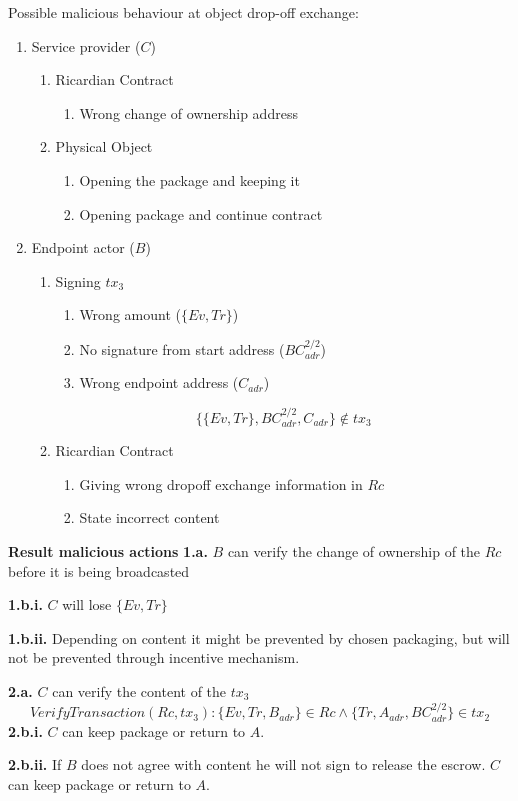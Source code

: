Possible malicious behaviour at object drop-off exchange:
\begin{enumerate}
  \item Service provider ($C$)
  \begin{enumerate}
    \item Ricardian Contract
    \begin{enumerate}
      \item Wrong change of ownership address
    \end{enumerate}
    \item Physical Object
    \begin{enumerate}
      \item Opening the package and keeping it
      \item Opening package and continue contract
    \end{enumerate}
  \end{enumerate}
  \item Endpoint actor ($B$)
  \begin{enumerate}
    \item Signing $tx_3$
    \begin{enumerate}
      \item Wrong amount ($\{Ev, Tr\}$)
      \item No signature from start address ($BC_{adr}^{2/2}$)
      \item Wrong endpoint address ($C_{adr}$)
    \end{enumerate}
    \[\{\{Ev, Tr\}, BC_{adr}^{2/2}, C_{adr}\}\not\in tx_3\]
    \item Ricardian Contract
    \begin{enumerate}
      \item Giving wrong dropoff exchange information in $Rc$
      \item State incorrect content
    \end{enumerate}
  \end{enumerate}
\end{enumerate}

\bigbreak
\noindent\textbf{Result malicious actions}
\bigbreak
\noindent\textbf{1.a.} $B$ can verify the change of ownership of the $Rc$ before it is being broadcasted \par
\noindent\textbf{1.b.i.} $C$ will lose $\{Ev, Tr\}$ \par
\noindent\textbf{1.b.ii.} Depending on content it might be prevented by chosen packaging, but will not be prevented through incentive mechanism. \par

\noindent\textbf{2.a.} $C$ can verify the content of the $tx_3$
\[VerifyTransaction(Rc, tx_3)\colon\{Ev, Tr, B_{adr}\} \in Rc \land \{Tr, A_{adr}, BC_{adr}^{2/2}\} \in tx_2\]
\noindent\textbf{2.b.i.} $C$ can keep package or return to $A$.\par
\noindent\textbf{2.b.ii.} If $B$ does not agree with content he will not sign to release the escrow. $C$ can keep package or return to $A$.\par

